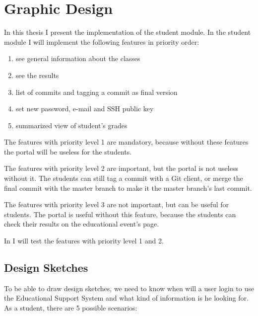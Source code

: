 \chapter{Graphic Design}

In this thesis I present the implementation of the student module. In the student module I will implement the following features in priority order:
\begin{enumerate}
	\item see general information about the classes
	\setcounter{enumi}{0}
	\item see the results
	\item list of commits and tagging a commit as final version
	\setcounter{enumi}{1}
	\item set new password, e-mail and SSH public key
	\item summarized view of student's grades
\end{enumerate}

The features with priority level 1 are mandatory, because without these features the portal will be useless for the students.

The features with priority level 2 are important, but the portal is not useless without it. The students can still tag a commit with a Git client, or merge the final commit with the master branch to make it the master branch's last commit. 

The features with priority level 3 are not important, but can be useful for students. The portal is useful without this feature, because the students can check their results on the educational event's page.

In  I will test the features with priority level 1 and 2.


\section{Design Sketches}
To be able to draw design sketches, we need to know when will a user login to use the Educational Support System and what kind of information is he looking for. As a student, there are 5 possible scenarios:


